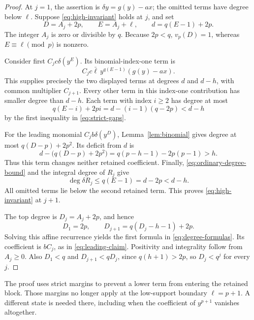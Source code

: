 \begin{proof}
At $j=1$, the assertion is $\delta y=g(y)-ax$; the omitted terms
have degree below $\ell$. Suppose \eqref{eq:high-invariant} holds
at $j$, and set
\[
 D=A_j+2p,\qquad E=A_j+\ell,\qquad
 d=q(E-1)+2p.
\]
The integer $A_j$ is zero or divisible by $q$. Because $2p<q$,
$v_p(D)=1$, whereas $E\equiv\ell\pmod p$ is nonzero.

Consider first $C_jc\delta(y^E)$. Its binomial-index-one term is
\[
 C_jc\bar\ell\,y^{q(E-1)}(g(y)-ax).
\]
This supplies precisely the two displayed terms at degrees $d$
and $d-h$, with common multiplier $C_{j+1}$. Every other term
in this index-one contribution has smaller degree than $d-h$.
Each term with index $i\ge2$ has degree at most
\[
 q(E-i)+2pi=d-(i-1)(q-2p)<d-h
\]
by the first inequality in \eqref{eq:strict-gaps}.

For the leading monomial $C_jb\delta(y^D)$, Lemma~\ref{lem:binomial}
gives degree at most $q(D-p)+2p^2$. Its deficit from $d$ is
\[
 d-\bigl(q(D-p)+2p^2\bigr)
 =q(p-h-1)-2p(p-1)>h.
\]
Thus this term changes neither retained coefficient. Finally,
\eqref{eq:ordinary-degree-bound} and the integral degree of $R_j$
give
\[
 \deg\delta R_j\le q(E-1)=d-2p<d-h.
\]
All omitted terms lie below the second retained term. This proves
\eqref{eq:high-invariant} at $j+1$.

The top degree is $D_j=A_j+2p$, and hence
\[
 D_1=2p,\qquad D_{j+1}=q(D_j-h-1)+2p.
\]
Solving this affine recurrence yields the first formula in
\eqref{eq:degree-formulas}. Its coefficient is $bC_j$, as in
\eqref{eq:leading-claim}. Positivity and integrality follow from
$A_j\ge0$. Also $D_1<q$ and $D_{j+1}<qD_j$, since
$q(h+1)>2p$, so $D_j<q^j$ for every $j$.
\end{proof}

The proof uses strict margins to prevent a lower term from entering
the retained block. Those margins no longer apply at the low-support
boundary $\ell=p+1$. A different state is needed there, including
when the coefficient of $y^{p+1}$ vanishes altogether.
